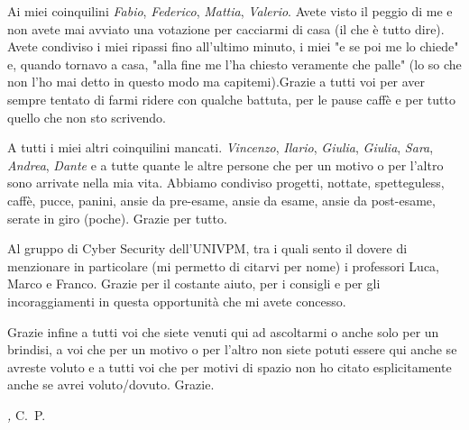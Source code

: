 Ai miei coinquilini \emph{Fabio}, \emph{Federico}, \emph{Mattia}, \emph{Valerio}. Avete visto il peggio di me e non avete mai avviato una votazione per cacciarmi di casa (il che è tutto dire). Avete condiviso i miei ripassi fino all'ultimo minuto, i miei "e se poi me lo chiede" e, quando tornavo a casa, "alla fine me l'ha chiesto veramente che palle" (lo so che non l'ho mai detto in questo modo ma capitemi).Grazie a tutti voi per aver sempre tentato di farmi ridere con qualche battuta, per le pause caffè e per tutto quello che non sto scrivendo.

A tutti i miei altri coinquilini mancati. \emph{Vincenzo}, \emph{Ilario}, \emph{Giulia}, \emph{Giulia}, \emph{Sara}, \emph{Andrea}, \emph{Dante} e a tutte quante le altre persone che per un motivo o per l'altro sono arrivate nella mia vita. Abbiamo condiviso progetti, nottate, spetteguless, caffè, pucce, panini, ansie da pre-esame, ansie da esame, ansie da post-esame, serate in giro (poche). Grazie per tutto.

Al gruppo di Cyber Security dell’UNIVPM, tra i quali sento il dovere di menzionare in particolare (mi permetto di citarvi per nome) i professori Luca, Marco e Franco. Grazie per il costante aiuto, per i consigli e per gli incoraggiamenti in questa opportunità che mi avete concesso. 

Grazie infine a tutti voi che siete venuti qui ad ascoltarmi o anche solo per un brindisi, a voi che per un motivo o per l'altro non siete potuti essere qui anche se avreste voluto e a tutti voi che per motivi di spazio non ho citato esplicitamente anche se avrei voluto/dovuto. Grazie.
%

\bigskip
%
\noindent\textit{\myLocation, \myTime}
\hfill C.~P.
%
